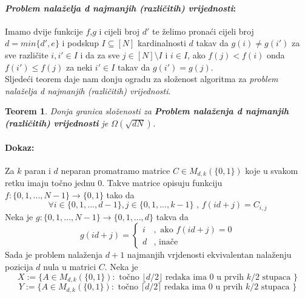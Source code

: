 \documentclass[a4paper,12pt]{article}
\newcommand\floor[1]{\lfloor#1\rfloor}
\newcommand\ceil[1]{\lceil#1\rceil}
\newtheorem{tm}{Teorem}
\begin{document}
\paragraph{\emph{ Problem nala\v{z}elja d najmanjih (razli\v{c}itih) vrijednosti}:\\} 			
 			Imamo dvije funkcije $f$,$g$ i cijeli broj $d'$ te \v{z}elimo prona\'ci cijeli broj $d=min\{d',e\}$ i 
			podskup $I\subseteq[N]$ kardinalnosti $d$ takav da $g(i)\neq g(i')$ za sve razli\v{c}ite $i,i'\in I$ 
			i da za sve $j\in[N]\setminus I$ i $i\in I$, ako $f(j)<f(i)$ onda $f(i')\leq f(j)$ za neki 
			$i'\in I$ takav da $g(i')=g(j)$.\\
			


Sljede\'ci teorem daje nam donju ogradu za slo\v{z}enost algoritma za  \emph{ problem nala\v{z}elja d najmanjih (razli\v{c}itih) vrijednosti}.
\newpage
\begin{tm}
	Donja granica slo\v{z}enosti za \textbf{Problem nala\v{z}enja d  najmanjih (razli\v{c}itih) vrijednosti} je $ \Omega ( \sqrt{dN} )$.
\end{tm}
\paragraph{Dokaz:}
Za $k$ paran i $d$ neparan promatramo matrice  $C \in M_{d,k}(\{ 0,1 \})$ koje u svakom retku imaju to\v{c}no jednu $0$. Takve matrice opisuju funkciju $f: \{0,1, ..., N-1 \} \rightarrow \{0, 1 \} $ tako da
\begin{equation*}	
	 \forall i \in \{0, 1, ..., d-1 \}, j \in \{0, 1, ..., k-1 \} \text{ ,   } f(id + j) = C_{i,j}
\end{equation*}
Neka je $g: \{0,1, ..., N-1 \} \rightarrow \{0, 1, ..., d \} $ takva da
\begin{equation*}
    g(id+j) = \begin{cases}
               i              &, \text{  ako     }f(id+j)=0\\
               d			  &, \text{  ina\v{c}e}
           \end{cases}
\end{equation*}
Sada je problem nala\v{z}enja $d+1$ najmanjih vrjdenosti ekvivalentan nala\v{z}enju pozicija $d$ nula u matrici $C$.
Neka je 
\begin{equation*}
 X := \{ A \in M_{d,k}(\{ 0,1 \}) : \text{ to\v{c}no } \floor{d/2} \text{ redaka ima } 0 \text{ u prvih } k/2 \text{ stupaca } \}
\end{equation*}
\begin{equation*}
 Y := \{ A \in M_{d,k}(\{ 0,1 \}) : \text{ to\v{c}no } \ceil{d/2} \text{ redaka ima } 0 \text{ u prvih } k/2 \text{ stupaca } \}
\end{equation*}
\end{document}
